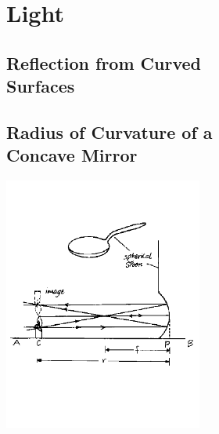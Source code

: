 \section{Light} 

\begin{multicols}{2}


\section*{Reflection from Curved \hfill \\ Surfaces} 


\subsection[Radius of Curvature of a Concave Mirror]{Radius of Curvature of a \hfill \\ Concave Mirror}

\begin{center}
\includegraphics[width=0.49\textwidth]{./img/source/radius-concave.png}
\end{center}


\end{multicols}
